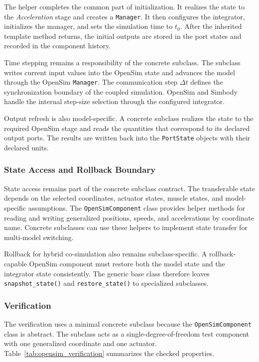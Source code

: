 The helper  completes the common part of initialization.
It realizes the state to the \textit{Acceleration} stage and creates a \texttt{Manager}.
It then configures the integrator, initializes the manager, and sets the simulation time to $t_0$.
After the inherited template method returns, the initial outputs are stored in the port states and recorded in the component history.

Time stepping remains a responsibility of the concrete subclass.
The subclass writes current input values into the OpenSim state and advances the model through the OpenSim \texttt{Manager}.
The communication step $\Delta t$ defines the synchronization boundary of the coupled simulation.
OpenSim and Simbody handle the internal step-size selection through the configured integrator.

Output refresh is also model-specific.
A concrete subclass realizes the state to the required OpenSim stage and reads the quantities that correspond to its declared output ports.
The results are written back into the \texttt{PortState} objects with their declared units.

\subsubsection{State Access and Rollback Boundary}

State access remains part of the concrete subclass contract.
The transferable state depends on the selected coordinates, actuator states, muscle states, and model-specific assumptions.
The \texttt{OpenSimComponent} class provides helper methods for reading and writing generalized positions, speeds, and accelerations by coordinate name.
Concrete subclasses can use these helpers to implement state transfer for multi-model switching.

Rollback for hybrid co-simulation also remains subclass-specific.
A rollback-capable OpenSim component must restore both the model state and the integrator state consistently.
The generic base class therefore leaves \texttt{snapshot\_state()} and \texttt{restore\_state()} to specialized subclasses.

\subsubsection{Verification}

The verification uses a minimal concrete subclass because the \texttt{OpenSimComponent} class is abstract.
The subclass acts as a single-degree-of-freedom test component with one generalized coordinate and one actuator.
Table~\ref{tab:opensim_verification} summarizes the checked properties.

